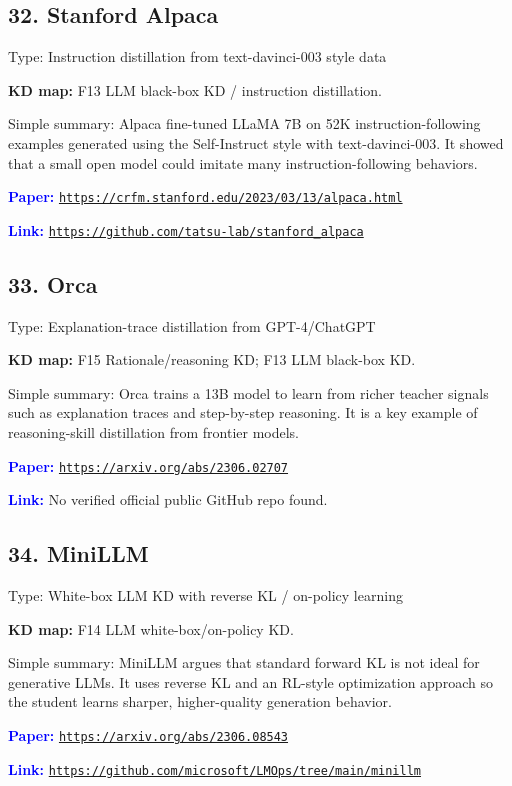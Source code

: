 \documentclass[10pt]{article}
\begin{document}
\subsection*{32. Stanford Alpaca}
Type: Instruction distillation from text-davinci-003 style data\par
\textbf{KD map:} F13 LLM black-box KD / instruction distillation.\par
Simple summary: Alpaca fine-tuned LLaMA 7B on 52K instruction-following examples generated using the Self-Instruct style with text-davinci-003. It showed that a small open model could imitate many instruction-following behaviors.\par
\textcolor{blue}{\textbf{Paper:}} \href{https://crfm.stanford.edu/2023/03/13/alpaca.html}{\nolinkurl{https://crfm.stanford.edu/2023/03/13/alpaca.html}}\par
\textcolor{blue}{\textbf{Link:}} \href{https://github.com/tatsu-lab/stanford_alpaca}{\nolinkurl{https://github.com/tatsu-lab/stanford_alpaca}}\par

\subsection*{33. Orca}
Type: Explanation-trace distillation from GPT-4/ChatGPT\par
\textbf{KD map:} F15 Rationale/reasoning KD; F13 LLM black-box KD.\par
Simple summary: Orca trains a 13B model to learn from richer teacher signals such as explanation traces and step-by-step reasoning. It is a key example of reasoning-skill distillation from frontier models.\par
\textcolor{blue}{\textbf{Paper:}} \href{https://arxiv.org/abs/2306.02707}{\nolinkurl{https://arxiv.org/abs/2306.02707}}\par
\textcolor{blue}{\textbf{Link:}} No verified official public GitHub repo found.\par

\subsection*{34. MiniLLM}
Type: White-box LLM KD with reverse KL / on-policy learning\par
\textbf{KD map:} F14 LLM white-box/on-policy KD.\par
Simple summary: MiniLLM argues that standard forward KL is not ideal for generative LLMs. It uses reverse KL and an RL-style optimization approach so the student learns sharper, higher-quality generation behavior.\par
\textcolor{blue}{\textbf{Paper:}} \href{https://arxiv.org/abs/2306.08543}{\nolinkurl{https://arxiv.org/abs/2306.08543}}\par
\textcolor{blue}{\textbf{Link:}} \href{https://github.com/microsoft/LMOps/tree/main/minillm}{\nolinkurl{https://github.com/microsoft/LMOps/tree/main/minillm}}\par
\end{document}
